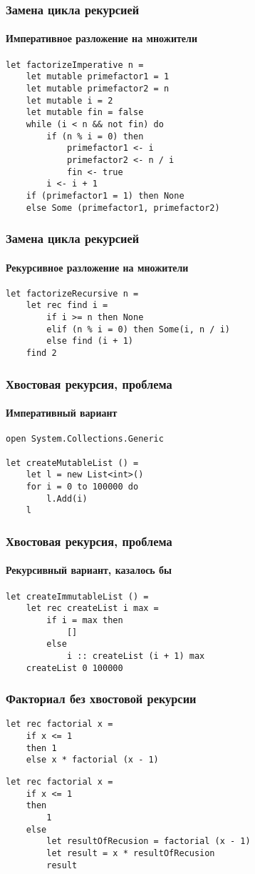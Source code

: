 \documentclass[xetex,mathserif,serif]{beamer}
\begin{document}
	\begin{frame}[fragile]
		\frametitle{Замена цикла рекурсией}
		\framesubtitle{Императивное разложение на множители}
		\begin{verbatim}
let factorizeImperative n =
    let mutable primefactor1 = 1
    let mutable primefactor2 = n
    let mutable i = 2
    let mutable fin = false
    while (i < n && not fin) do
        if (n % i = 0) then
            primefactor1 <- i
            primefactor2 <- n / i
            fin <- true
        i <- i + 1
    if (primefactor1 = 1) then None
    else Some (primefactor1, primefactor2)
		\end{verbatim}
	\end{frame}

	\begin{frame}[fragile]
		\frametitle{Замена цикла рекурсией}
		\framesubtitle{Рекурсивное разложение на множители}
		\begin{verbatim}
let factorizeRecursive n =
    let rec find i =
        if i >= n then None
        elif (n % i = 0) then Some(i, n / i)
        else find (i + 1)
    find 2
		\end{verbatim}
	\end{frame}

	\begin{frame}[fragile]
		\frametitle{Хвостовая рекурсия, проблема}
		\framesubtitle{Императивный вариант}
		\begin{verbatim}
open System.Collections.Generic

let createMutableList () =
    let l = new List<int>()
    for i = 0 to 100000 do
        l.Add(i)
    l
		\end{verbatim}
	\end{frame}

	\begin{frame}[fragile]
		\frametitle{Хвостовая рекурсия, проблема}
		\framesubtitle{Рекурсивный вариант, казалось бы}
		\begin{verbatim}
let createImmutableList () =
    let rec createList i max =
        if i = max then
            []
        else
            i :: createList (i + 1) max
    createList 0 100000
		\end{verbatim}
	\end{frame}

	\begin{frame}[fragile]
		\frametitle{Факториал без хвостовой рекурсии}
		\begin{verbatim}
let rec factorial x =
    if x <= 1
    then 1 
    else x * factorial (x - 1)
		\end{verbatim}

		\begin{verbatim}
let rec factorial x =
    if x <= 1
    then
        1
    else
        let resultOfRecusion = factorial (x - 1)
        let result = x * resultOfRecusion
        result
		\end{verbatim}
	\end{frame}
\end{document}
